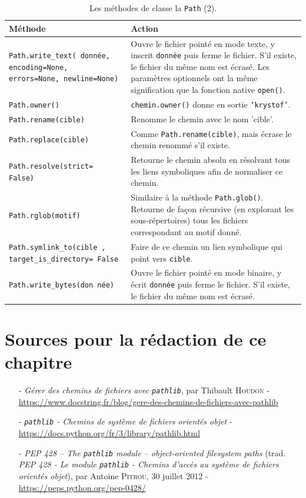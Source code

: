 \documentclass[a4paper,11pt]{book}
\begin{document}
\begin{table}[h]\label{pathlib_2}
\begin{center}
\begin{tabular}{|p{4cm}|p{10.5cm}|}
\hline
\textbf{Méthode} & \textbf{Action} \\
\hline
\texttt{Path.write\_text(
donnée, encoding=None, errors=None, newline=None)} & Ouvre le fichier pointé en mode texte, y inscrit \texttt{donnée} puis ferme le fichier. S'il existe, le fichier du même nom est écrasé. Les paramètres optionnels ont la même signification que la fonction native \texttt{open()}. \\
\hline
\texttt{Path.owner()} & \texttt{chemin.owner()} donne en sortie \texttt{'krystof'}. \\
\hline
\texttt{Path.rename(cible)} & Renomme le chemin avec le nom 'cible'. \\
\hline
\texttt{Path.replace(cible)} & Comme \texttt{Path.rename(cible)}, mais écrase le chemin renommé s'il existe. \\
\hline
\texttt{Path.resolve(strict=
False)} & Retourne le chemin absolu en résolvant tous les liens symboliques afin de normaliser ce chemin. \\
\hline
\texttt{Path.rglob(motif)} & Similaire à la méthode \texttt{Path.glob()}. Retourne de façon récursive (en explorant les sous-répertoires) tous les fichiers correspondant au motif donné. \\
\hline
\texttt{Path.symlink\_to(cible
, target\_is\_directory=
False} & Faire de ce chemin un lien symbolique qui point vers \texttt{cible}. \\
\hline
\texttt{Path.write\_bytes(don
née)} & Ouvre le fichier pointé en mode binaire, y écrit \texttt{donnée} puis ferme le fichier. S'il existe, le fichier du même nom est écrasé. \\
\hline
\end{tabular}
\caption{Les méthodes de classe la  \texttt{Path} (2).}
\end{center}
\end{table}
\medskip

\section{Sources pour la rédaction de ce chapitre}
\begin{itemize}
	\item[-] \textit{Gérer des chemins de fichiers avec \texttt{pathlib}}, par Thibault \textsc{Houdon} - \url{https://www.docstring.fr/blog/gere-des-chemins-de-fichiers-avec-pathlib}
	\item[-] \textit{\texttt{pathlib} - Chemins de système de fichiers orientés objet} - \url{https://docs.python.org/fr/3/library/pathlib.html}
	\item[-] \textit{PEP 428 – The \texttt{pathlib} module – object-oriented filesystem paths} (trad. \textit{PEP 428 - Le module \texttt{pathlib} - Chemins d'accès au système de fichiers orientés objet}), par Antoine \textsc{Pitrou}, 30 juillet 2012 - \url{https://peps.python.org/pep-0428/}  
\end{itemize}
\medskip
\end{document}
